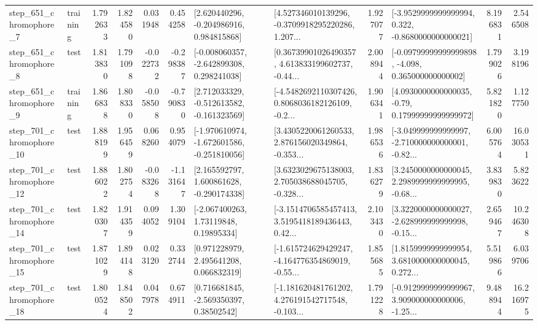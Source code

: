 \begin{tabular}{llrrrrllrlrr}
   step\_651\_chromophore\_7 &  training &      1.792633 &    1.824580 &      0.031948 &  0.454258 &    [2.620440296, -0.204986916, 0.984815868] &  [4.527346010139296, -0.3709918295220286, 1.207... &       1.927077 &  [-3.9529999999999994, 0.322, -0.8680000000000021] &            8.196831 &          2.546508 \\
   step\_651\_chromophore\_8 &      test &      1.813830 &    1.791098 &     -0.022732 & -0.298387 &   [-0.008060357, -2.642899308, 0.298241038] &  [0.36739901026490357, 4.613833199602737, -0.44... &       2.008944 &  [-0.09799999999999898, -4.098, 0.365000000000002] &            1.799026 &          3.198196 \\
   step\_651\_chromophore\_9 &  training &      1.866838 &    1.808330 &     -0.058508 & -0.790830 &   [2.712033329, -0.512613582, -0.161323569] &  [-4.5482692110307426, 0.8068036182126109, -0.2... &       1.906341 &   [4.0930000000000035, -0.79, 0.17999999999999972] &            5.821820 &          1.127750 \\
  step\_701\_chromophore\_10 &      test &      1.888199 &    1.956459 &      0.068260 &  0.954079 &  [-1.970610974, -1.672601586, -0.251810056] &  [3.4305220061260533, 2.876156020349864, -0.353... &       1.986536 &  [-3.049999999999997, -2.710000000000001, -0.82... &            6.005764 &         16.030531 \\
  step\_701\_chromophore\_12 &      test &      1.886022 &    1.802754 &     -0.083268 & -1.131647 &    [2.165592797, 1.600861628, -0.290174338] &  [3.6323029675138003, 2.705038688045705, -0.328... &       1.836279 &  [3.2450000000000045, 2.2989999999999995, -0.68... &            3.839830 &          5.823622 \\
  step\_701\_chromophore\_14 &      test &      1.820307 &    1.914359 &      0.094052 &  1.309104 &      [-2.067400263, 1.73119848, 0.19895334] &  [-3.1514706585457413, 3.5195418189436443, 0.42... &       2.103430 &  [3.3220000000000027, -2.628999999999998, -0.15... &            2.659467 &         10.246308 \\
  step\_701\_chromophore\_15 &      test &      1.871029 &    1.894148 &      0.023120 &  0.332744 &     [0.971228979, 2.495641208, 0.066832319] &  [-1.615724629429247, -4.164776354869019, -0.55... &       1.855685 &  [1.8159999999999954, 3.6810000000000045, 0.272... &            5.519866 &          6.039706 \\
  step\_701\_chromophore\_18 &      test &      1.800524 &    1.848502 &      0.047978 &  0.674911 &     [0.716681845, -2.569350397, 0.38502542] &  [-1.181620481761202, 4.276191542717548, -0.103... &       1.791228 &  [-0.9129999999999967, 3.909000000000006, -1.25... &            9.488944 &         16.216975 \\

\end{tabular}
